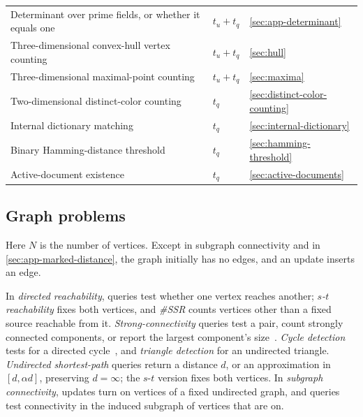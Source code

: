 \begin{longtable}{@{}>{\raggedright\arraybackslash}p{}>{\raggedright\arraybackslash}p{}p{}@{}}
Determinant over prime fields, or whether it equals one & $t_u+t_q$ & \ref{sec:app-determinant}\\
Three-dimensional convex-hull vertex counting & $t_u+t_q$ & \ref{sec:hull}\\
Three-dimensional maximal-point counting & $t_u+t_q$ & \ref{sec:maxima}\\
Two-dimensional distinct-color counting & $t_q$ & \ref{sec:distinct-color-counting}\\
Internal dictionary matching & $t_q$ & \ref{sec:internal-dictionary}\\
Binary Hamming-distance threshold & $t_q$ & \ref{sec:hamming-threshold}\\
Active-document existence & $t_q$ & \ref{sec:active-documents}\\
\end{longtable}
\endgroup

\subsection{Graph problems}\label{sec:graph-problems}

Here $N$ is the number of vertices. Except in subgraph connectivity and in \cref{sec:app-marked-distance}, the graph initially has no edges, and an update inserts an edge.

In \emph{directed reachability}, queries test whether one vertex reaches another; \emph{$s$-$t$ reachability} fixes both vertices, and \emph{\#SSR} counts vertices other than a fixed source reachable from it. \emph{Strong-connectivity} queries test a pair, count strongly connected components, or report the largest component's size~\cite{abboud_popular_2014,haeupler_incremental_2012}. \emph{Cycle detection} tests for a directed cycle~\cite{haeupler_incremental_2012,chen_almost-linear_2024}, and \emph{triangle detection} for an undirected triangle. \emph{Undirected shortest-path} queries return a distance $d$, or an approximation in $[d,\alpha d]$, preserving $d=\infty$; the $s$-$t$ version fixes both vertices. In \emph{subgraph connectivity}, updates turn on vertices of a fixed undirected graph, and queries test connectivity in the induced subgraph of vertices that are on.

